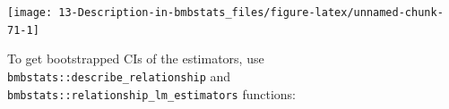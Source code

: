 \documentclass[
]{book}
\newenvironment{Shaded}{\begin{snugshade}}{\end{snugshade}}
\newcommand{\DataTypeTok}[1]{\textcolor[rgb]{0.13,0.29,0.53}{#1}}
\newcommand{\DecValTok}[1]{\textcolor[rgb]{0.00,0.00,0.81}{#1}}
\newcommand{\KeywordTok}[1]{\textcolor[rgb]{0.13,0.29,0.53}{\textbf{#1}}}
\newcommand{\NormalTok}[1]{#1}
\newcommand{\OperatorTok}[1]{\textcolor[rgb]{0.81,0.36,0.00}{\textbf{#1}}}
\newcommand{\StringTok}[1]{\textcolor[rgb]{0.31,0.60,0.02}{#1}}
\begin{document}
\begin{Shaded}
\end{Shaded}

\begin{center}\texttt{[image: 13-Description-in-bmbstats\_files/figure-latex/unnamed-chunk-71-1]} \end{center}

To get bootstrapped CIs of the estimators, use \texttt{bmbstats::describe\_relationship} and \texttt{bmbstats::relationship\_lm\_estimators} functions:
\end{document}
